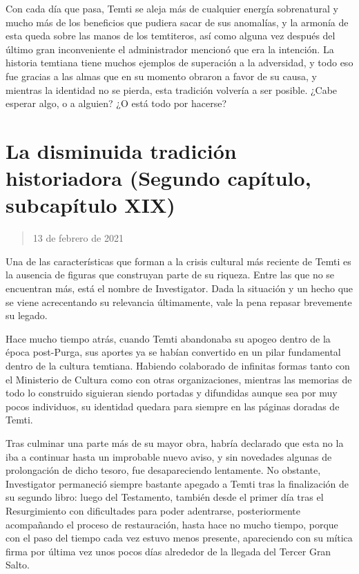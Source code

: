 \documentclass[
  spanish,
]{book}
\begin{document}
Con cada día que pasa, Temti se aleja más de cualquier energía sobrenatural y mucho más de los beneficios que pudiera sacar de sus anomalías, y la armonía de esta queda sobre las manos de los temtiteros, así como alguna vez después del último gran inconveniente el administrador mencionó que era la intención. La historia temtiana tiene muchos ejemplos de superación a la adversidad, y todo eso fue gracias a las almas que en su momento obraron a favor de su causa, y mientras la identidad no se pierda, esta tradición volvería a ser posible. ¿Cabe esperar algo, o a alguien? ¿O está todo por hacerse?

\hypertarget{la-disminuida-tradiciuxf3n-historiadora-segundo-capuxedtulo-subcapuxedtulo-xix}{%
\section{La disminuida tradición historiadora (Segundo capítulo, subcapítulo XIX)}\label{la-disminuida-tradiciuxf3n-historiadora-segundo-capuxedtulo-subcapuxedtulo-xix}}

\begin{quote}
13 de febrero de 2021
\end{quote}

Una de las características que forman a la crisis cultural más reciente de Temti es la ausencia de figuras que construyan parte de su riqueza. Entre las que no se encuentran más, está el nombre de Investigator. Dada la situación y un hecho que se viene acrecentando su relevancia últimamente, vale la pena repasar brevemente su legado.

Hace mucho tiempo atrás, cuando Temti abandonaba su apogeo dentro de la época post-Purga, sus aportes ya se habían convertido en un pilar fundamental dentro de la cultura temtiana. Habiendo colaborado de infinitas formas tanto con el Ministerio de Cultura como con otras organizaciones, mientras las memorias de todo lo construido siguieran siendo portadas y difundidas aunque sea por muy pocos individuos, su identidad quedara para siempre en las páginas doradas de Temti.

Tras culminar una parte más de su mayor obra, habría declarado que esta no la iba a continuar hasta un improbable nuevo aviso, y sin novedades algunas de prolongación de dicho tesoro, fue desapareciendo lentamente. No obstante, Investigator permaneció siempre bastante apegado a Temti tras la finalización de su segundo libro: luego del Testamento, también desde el primer día tras el Resurgimiento con dificultades para poder adentrarse, posteriormente acompañando el proceso de restauración, hasta hace no mucho tiempo, porque con el paso del tiempo cada vez estuvo menos presente, apareciendo con su mítica firma por última vez unos pocos días alrededor de la llegada del Tercer Gran Salto.
\end{document}
